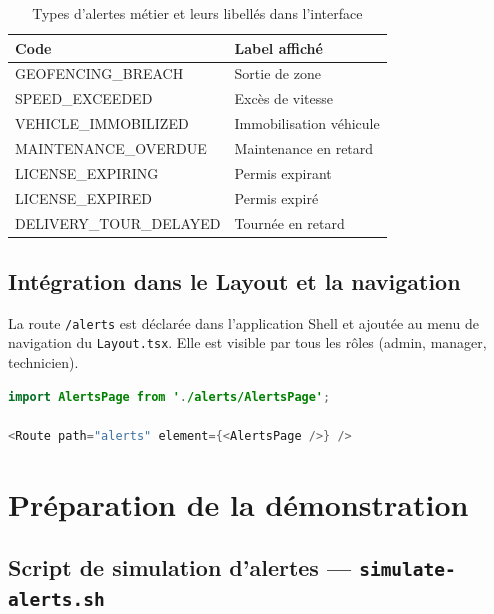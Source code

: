 \documentclass[12pt,a4paper]{article}
\begin{document}
\begin{table}[H]
\centering
\small
\renewcommand{\arraystretch}{1.4}
\begin{tabular}{
  >{\ttfamily\raggedright\arraybackslash}p{5.8cm}
  >{\raggedright\arraybackslash}p{6.5cm}
}
\toprule
\rowcolor{secondary}
\normalfont\textbf{Code} & \normalfont\textbf{Label affich\'{e}} \\
\midrule
GEOFENCING\_BREACH      & Sortie de zone \\
\rowcolor{rowgray}
SPEED\_EXCEEDED         & Exc\`{e}s de vitesse \\
VEHICLE\_IMMOBILIZED    & Immobilisation v\'{e}hicule \\
\rowcolor{rowgray}
MAINTENANCE\_OVERDUE    & Maintenance en retard \\
LICENSE\_EXPIRING       & Permis expirant \\
\rowcolor{rowgray}
LICENSE\_EXPIRED        & Permis expir\'{e} \\
DELIVERY\_TOUR\_DELAYED & Tourn\'{e}e en retard \\
\bottomrule
\end{tabular}
\caption{Types d'alertes m\'{e}tier et leurs libell\'{e}s dans l'interface}
\end{table}

\subsection{Int\'{e}gration dans le Layout et la navigation}

La route \texttt{/alerts} est d\'{e}clar\'{e}e dans l'application Shell et ajout\'{e}e
au menu de navigation du \texttt{Layout.tsx}. Elle est visible par tous les
r\^{o}les (admin, manager, technicien).

\begin{lstlisting}[language=Java, caption=Route /alerts dans \texttt{App.tsx} (shell)]
import AlertsPage from './alerts/AlertsPage';

<Route path="alerts" element={<AlertsPage />} />
\end{lstlisting}

\section{Pr\'{e}paration de la d\'{e}monstration}

\subsection{Script de simulation d'alertes --- \texttt{simulate-alerts.sh}}
\end{document}
